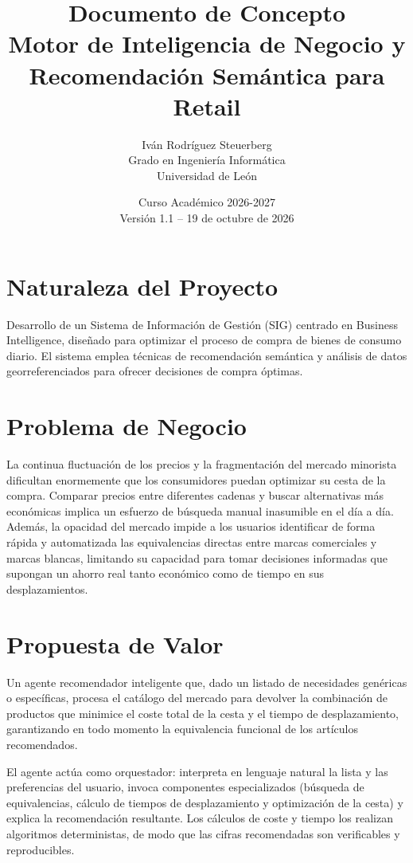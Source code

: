 \documentclass[11pt,a4paper]{article}
\title{\textbf{Documento de Concepto} \\ \Large Motor de Inteligencia de Negocio y Recomendación Semántica para Retail}
\author{Iván Rodríguez Steuerberg \\ Grado en Ingeniería Informática \\ Universidad de León}
\date{Curso Académico 2026-2027 \\ Versión 1.1 -- 19 de octubre de 2026}
\begin{document}
	\maketitle
	
	\section{Naturaleza del Proyecto}
	Desarrollo de un Sistema de Información de Gestión (SIG) centrado en Business Intelligence, diseñado para optimizar el proceso de compra de bienes de consumo diario. El sistema emplea técnicas de recomendación semántica y análisis de datos georreferenciados para ofrecer decisiones de compra óptimas.
	
	\section{Problema de Negocio}
	La continua fluctuación de los precios y la fragmentación del mercado minorista dificultan enormemente que los consumidores puedan optimizar su cesta de la compra. Comparar precios entre diferentes cadenas y buscar alternativas más económicas implica un esfuerzo de búsqueda manual inasumible en el día a día. Además, la opacidad del mercado impide a los usuarios identificar de forma rápida y automatizada las equivalencias directas entre marcas comerciales y marcas blancas, limitando su capacidad para tomar decisiones informadas que supongan un ahorro real tanto económico como de tiempo en sus desplazamientos.
	
	\section{Propuesta de Valor}
	Un agente recomendador inteligente que, dado un listado de necesidades genéricas o específicas, procesa el catálogo del mercado para devolver la combinación de productos que minimice el coste total de la cesta y el tiempo de desplazamiento, garantizando en todo momento la equivalencia funcional de los artículos recomendados.

	El agente actúa como orquestador: interpreta en lenguaje natural la lista y las preferencias del usuario, invoca componentes especializados (búsqueda de equivalencias, cálculo de tiempos de desplazamiento y optimización de la cesta) y explica la recomendación resultante. Los cálculos de coste y tiempo los realizan algoritmos deterministas, de modo que las cifras recomendadas son verificables y reproducibles.
	
\end{document}
